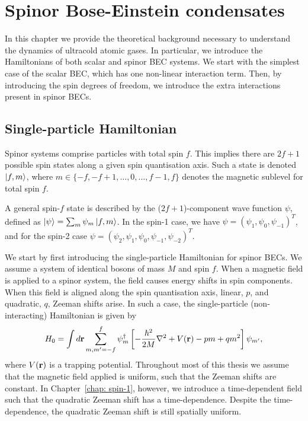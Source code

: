 \chapter{Spinor Bose-Einstein condensates}

In this chapter we provide the theoretical background necessary to understand
the dynamics of ultracold atomic gases.
In particular, we introduce the Hamiltonians of both scalar and spinor BEC
systems.
We start with the simplest case of the scalar BEC, which has one non-linear
interaction term.
Then, by introducing the spin degrees of freedom, we introduce the extra
interactions present in spinor BECs.

\section{Single-particle Hamiltonian}
Spinor systems comprise particles with total spin \(f\).
This implies there are \(2f + 1\) possible spin states along a given spin
quantisation axis.
Such a state is denoted \(\ket{f, m} \), where
\(m \in \{-f, -f+1, \ldots, 0, \ldots, f - 1, f\} \) denotes the magnetic
sublevel for total spin \( f\).

A general spin-\(f\) state is described by the (\(2f+1\))-component wave
function \(\psi \), defined as \(\ket{\psi} = \sum_m\psi_m\ket{f, m}\).
In the spin-1 case, we have \(\psi = {(\psi_1, \psi_0, \psi_{-1})}^T\), and for
the spin-2 case \(\psi = {(\psi_2, \psi_1, \psi_0, \psi_{-1}, \psi_{-2})}^T\).

We start by first introducing the single-particle Hamiltonian for spinor BECs.
We assume a system of identical bosons of mass \(M\) and spin \(f\).
When a magnetic field is applied to a spinor system, the field causes energy
shifts in spin components.
When this field is aligned along the spin quantisation axis, linear, \(p\), and
quadratic, \(q\), Zeeman shifts arise.
In such a case, the single-particle (non-interacting) Hamiltonian is given
by~\cite{Kawaguchi2012}
\begin{equation}\label{eq: single-particle-Hamiltonian}
    H_0 = \int d\vb{r}\sum_{m,m'=-f}^{f} \psi_m^\dagger \left[
        -\frac{\hbar^2}{2M}\nabla^2 + V(\vb{r}) - pm + qm^2\right]\psi_{m'},
\end{equation}
where \(V(\vb{r})\) is a trapping potential.
Throughout most of this thesis we assume that the magnetic field applied is
uniform, such that the Zeeman shifts are constant.
In Chapter~\ref{chap: spin-1}, however, we introduce a time-dependent field
such that the quadratic Zeeman shift has a time-dependence.
Despite the time-dependence, the quadratic Zeeman shift is still spatially
uniform.

